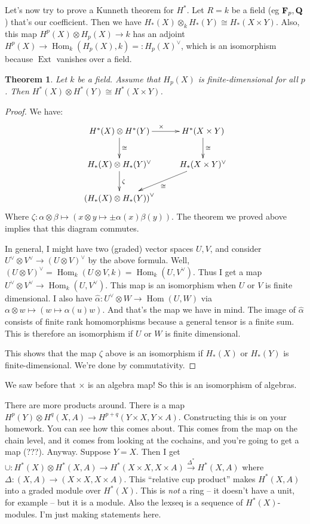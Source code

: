 \documentclass{amsart}
\theoremstyle{theorem}
\newtheorem{theorem}{Theorem}[section]
\theoremstyle{definition}
\DeclareMathOperator{\Ext}{Ext}
\DeclareMathOperator{\Hom}{Hom}
\def\QQ{\mathbf Q}\def\RR{\mathbf R}\def\SS{\mathbb S}\def\TT{\mathbb T}
\begin{document}
Let's now try to prove a Kunneth theorem for $ H^\ast$. Let $R=k$ be a field (eg $\FF_p,\QQ$) that's our coefficient. Then we have $ H_\ast(X)\otimes_k H_\ast(Y)\cong H_\ast(X\times Y)$. Also, this map $ H^p(X)\otimes H_p(X)\to k$ has an adjoint $ H^p(X)\to \Hom_k( H_p(X),k)=: H_p(X)^\vee$, which is an isomorphism because $\Ext$ vanishes over a field.
\begin{theorem}
Let $k$ be a field. Assume that $ H_p(X)$ is finite-dimensional for all $p$. Then $ H^\ast(X)\otimes H^\ast(Y)\cong H^\ast(X\times Y)$.
\end{theorem}
\begin{proof}
We have:
\begin{equation*}
\xymatrix{
	 H^\ast(X)\otimes H^\ast(Y)\ar[r]^{\times}\ar[d]^\cong & H^\ast(X\times Y)\ar[d]^\cong\\
	 H_\ast(X)\otimes H_\ast(Y)^\vee\ar[d]^{\zeta} & H_\ast(X\times Y)^\vee\ar[dl]^\cong\\
	\left( H_\ast(X)\otimes H_\ast(Y)\right)^\vee
}
\end{equation*}
Where $\zeta:\alpha\otimes\beta\mapsto(x\otimes y\mapsto \pm\alpha(x)\beta(y))$. The theorem we proved above implies that this diagram commutes.

In general, I might have two (graded) vector spaces $U,V$, and consider $U^\vee\otimes V^\vee\to(U\otimes V)^\vee$ by the above formula. Well, $(U\otimes V)^\vee=\Hom_k(U\otimes V,k)=\Hom_k(U,V^\vee)$. Thus I get a map $U^\vee\otimes V^\vee\to\Hom_k(U,V^\vee)$. This map is an isomorphism when $U$ or $V$ is finite dimensional. I also have $\widehat{\alpha}:U^\vee\otimes W\to \Hom(U,W)$ via $\alpha\otimes w\mapsto(w\mapsto\alpha(u)w)$. And that's the map we have in mind. The image of $\widehat{\alpha}$ consists of finite rank homomorphisms because a general tensor is a finite sum. This is therefore an isomorphism if $U$ or $W$ is finite dimensional. 

This shows that the map $\zeta$ above is an isomorphism if $ H_\ast(X)$ or $ H_\ast(Y)$ is finite-dimensional. We're done by commutativity.
\end{proof}
We saw before that $\times$ is an algebra map! So this is an isomorphism of algebras.

There are more products around. There is a map $ H^p(Y)\otimes H^q(X,A)\to H^{p+q}(Y\times X,Y\times A)$. Constructing this is on your homework. You can see how this comes about. This comes from the map on the chain level, and it comes from looking at the cochains, and you're going to get a map (???). Anyway. Suppose $Y=X$. Then I get $\cup: H^\ast(X)\otimes H^\ast(X,A)\to H^\ast(X\times X,X\times A)\xrightarrow{\Delta^\ast} H^\ast(X,A)$ where $\Delta:(X,A)\to (X\times X,X\times A)$. This ``relative cup product'' makes $ H^\ast(X,A)$ into a graded module over $ H^\ast(X)$. This is \emph{not} a ring -- it doesn't have a unit, for example -- but it is a module. Also the lexseq is a sequence of $ H^\ast(X)$-modules. I'm just making statements here.
\end{document}
